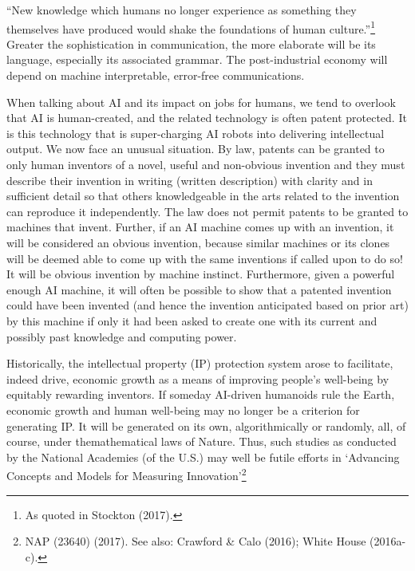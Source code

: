 \begin{multicols}{2}
\noindent
“New knowledge which humans no longer experience as something they themselves have produced would shake the foundations of human culture.”\footnote{As quoted in Stockton (2017).}  Greater the sophistication in communication, the more elaborate will be its language, especially its associated grammar. The post-industrial economy will depend on machine interpretable, error-free communications.

When talking about AI and its impact on jobs for humans, we tend to overlook that AI is human-created, and the related technology is often patent protected. It is this technology that is super-charging AI robots into delivering intellectual output. We now face an unusual situation. By law, patents can be granted to only human inventors of a novel, useful and non-obvious invention and they must describe their invention in writing (written description) with clarity and in sufficient detail so that others knowledgeable in the arts related to the invention can reproduce it independently. The law does not permit patents to be granted to machines that invent. Further, if an AI machine comes up with an invention, it will be considered an obvious invention, because similar machines or its clones will be deemed able to come up with the same inventions if called upon to do so! It will be obvious invention by machine instinct. Furthermore, given a powerful enough AI machine, it will often be possible to show that a patented invention could have been invented (and hence the invention anticipated based on prior art) by this machine if only it had been asked to create one with its current and possibly past knowledge and computing power.

Historically, the intellectual property (IP) protection system arose to facilitate, indeed drive, economic growth as a means of improving people's well-being by equitably rewarding inventors. If someday AI-driven humanoids rule the Earth, economic growth and human well-being may no longer be a criterion for generating IP. It will be generated on its own, algorithmically or randomly, all, of course, under themathematical laws of Nature. Thus, such studies as conducted by the National Academies (of the U.S.) may well be futile efforts in ‘Advancing Concepts and Models for Measuring Innovation’\footnote{NAP (23640) (2017). See also: Crawford \& Calo (2016); White House (2016a-c).}  


\end{multicols}
